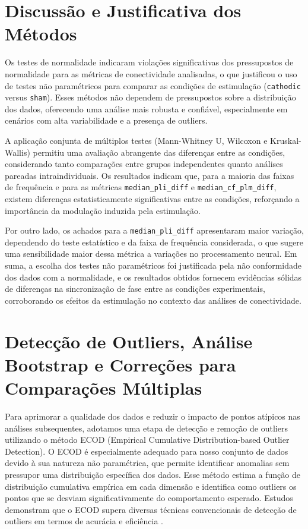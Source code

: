 \section{Discussão e Justificativa dos Métodos}

Os testes de normalidade indicaram violações significativas dos pressupostos de normalidade para as métricas de conectividade analisadas, o que justificou o uso de testes não paramétricos para comparar as condições de estimulação (\texttt{cathodic} versus \texttt{sham}). Esses métodos não dependem de pressupostos sobre a distribuição dos dados, oferecendo uma análise mais robusta e confiável, especialmente em cenários com alta variabilidade e a presença de outliers.

A aplicação conjunta de múltiplos testes (Mann-Whitney U, Wilcoxon e Kruskal-Wallis) permitiu uma avaliação abrangente das diferenças entre as condições, considerando tanto comparações entre grupos independentes quanto análises pareadas intraindividuais. Os resultados indicam que, para a maioria das faixas de frequência e para as métricas \texttt{median\_pli\_diff} e \texttt{median\_cf\_plm\_diff}, existem diferenças estatisticamente significativas entre as condições, reforçando a importância da modulação induzida pela estimulação.

Por outro lado, os achados para a \texttt{median\_pli\_diff} apresentaram maior variação, dependendo do teste estatístico e da faixa de frequência considerada, o que sugere uma sensibilidade maior dessa métrica a variações no processamento neural. Em suma, a escolha dos testes não paramétricos foi justificada pela não conformidade dos dados com a normalidade, e os resultados obtidos fornecem evidências sólidas de diferenças na sincronização de fase entre as condições experimentais, corroborando os efeitos da estimulação no contexto das análises de conectividade.

\section{Detecção de Outliers, Análise Bootstrap e Correções para Comparações Múltiplas}

Para aprimorar a qualidade dos dados e reduzir o impacto de pontos atípicos nas análises subsequentes, adotamos uma etapa de detecção e remoção de outliers utilizando o método ECOD (Empirical Cumulative Distribution-based Outlier Detection). O ECOD é especialmente adequado para nosso conjunto de dados devido à sua natureza não paramétrica, que permite identificar anomalias sem pressupor uma distribuição específica dos dados. Esse método estima a função de distribuição cumulativa empírica em cada dimensão e identifica como outliers os pontos que se desviam significativamente do comportamento esperado. Estudos demonstram que o ECOD supera diversas técnicas convencionais de detecção de outliers em termos de acurácia e eficiência \cite{li2022ecod}.

